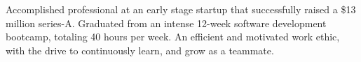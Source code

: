 
{
Accomplished professional at an early stage startup that successfully raised a \$13 million series-A. Graduated from an intense 12-week software development bootcamp, totaling 40 hours per week. An efficient and motivated work ethic, with the drive to continuously learn, and grow as a teammate.
}